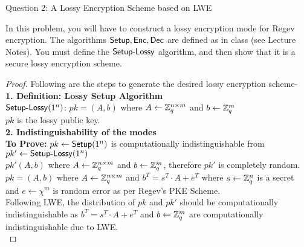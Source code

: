 \begin{solution}{Question 2: A Lossy Encryption Scheme based on LWE}\label{ques:2}
    \begin{question}
    In this problem, you will have to construct a lossy encryption mode for Regev encryption. The algorithms $\mathsf{Setup}, \mathsf{Enc}, \mathsf{Dec}$ are defined as in class (see Lecture Notes). You must define the $\mathsf{Setup\text{-}Lossy}$ algorithm, and then show that it is a secure lossy encryption scheme.
    \end{question}
%
    \tcblower{}
    \begin{proof} Following are the steps to generate the desired lossy encryption scheme-\\
    \textbf{1. Definition: Lossy Setup Algorithm}\\
    $\mathsf{Setup\text{-}Lossy}(1^n)$: $pk=(A,b)$ where $A\leftarrow\mathbb{Z}^{n\times m}_q$ and $b\leftarrow\mathbb{Z}^m_q$\\
    $pk$ is the lossy public key.\\

    
    \textbf{2. Indistinguishability of the modes}\\
    \textbf{To Prove:} $pk\leftarrow\mathsf{Setup}(1^n)$ is computationally indistinguishable from $pk'\leftarrow\mathsf{Setup\text{-}Lossy}(1^n)$\\
     $pk'(A,b)$ where $A\leftarrow\mathbb{Z}^{n\times m}_q$ and $b\leftarrow\mathbb{Z}^m_q$, therefore $pk'$ is completely random.\\
     $pk = (A,b)$ where $A\leftarrow\mathbb{Z}^{n\times m}_q$ and $b^T = s^T \cdot A +e^T$ where $s\leftarrow\mathbb{Z}^n_q$ is a secret and $e\leftarrow\chi^m$ is random error as per Regev's PKE Scheme.
    \\
    Following LWE, the distribution of $pk$ and $pk'$ should be computationally indistinguishable as $b^T = s^T \cdot A +e^T$ and $b\leftarrow\mathbb{Z}^m_q$ are computationally indistinguishable due to LWE.\\
    

\end{proof}
\end{solution}
